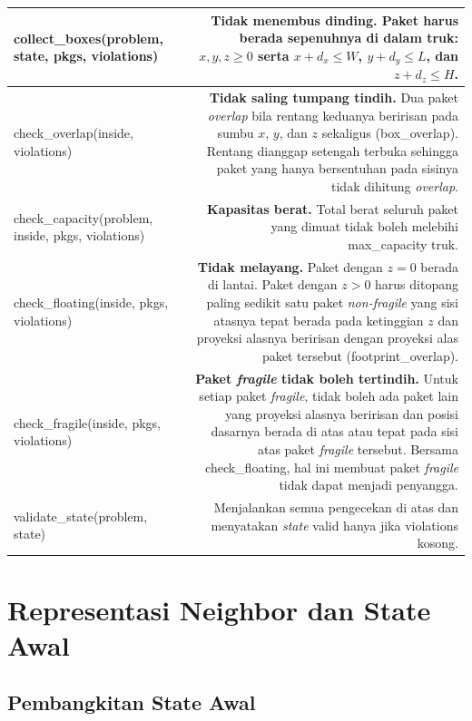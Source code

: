 \begin{longtable}{|K|D|}
collect\_boxes(problem, state, pkgs, violations) & \textbf{Tidak menembus dinding.} Paket harus berada sepenuhnya di dalam truk: $x, y, z \geq 0$ serta $x + d_x \leq W$, $y + d_y \leq L$, dan $z + d_z \leq H$. \\ \hline
check\_overlap(inside, violations) & \textbf{Tidak saling tumpang tindih.} Dua paket \textit{overlap} bila rentang keduanya beririsan pada sumbu $x$, $y$, dan $z$ sekaligus (box\_overlap). Rentang dianggap setengah terbuka sehingga paket yang hanya bersentuhan pada sisinya tidak dihitung \textit{overlap}. \\ \hline
check\_capacity(problem, inside, pkgs, violations) & \textbf{Kapasitas berat.} Total berat seluruh paket yang dimuat tidak boleh melebihi max\_capacity truk. \\ \hline
check\_floating(inside, pkgs, violations) & \textbf{Tidak melayang.} Paket dengan $z = 0$ berada di lantai. Paket dengan $z > 0$ harus ditopang paling sedikit satu paket \textit{non-fragile} yang sisi atasnya tepat berada pada ketinggian $z$ dan proyeksi alasnya beririsan dengan proyeksi alas paket tersebut (footprint\_overlap). \\ \hline
check\_fragile(inside, pkgs, violations) & \textbf{Paket \textit{fragile} tidak boleh tertindih.} Untuk setiap paket \textit{fragile}, tidak boleh ada paket lain yang proyeksi alasnya beririsan dan posisi dasarnya berada di atas atau tepat pada sisi atas paket \textit{fragile} tersebut. Bersama check\_floating, hal ini membuat paket \textit{fragile} tidak dapat menjadi penyangga. \\ \hline
validate\_state(problem, state) & Menjalankan semua pengecekan di atas dan menyatakan \textit{state} valid hanya jika violations kosong. \\ \hline
\end{longtable}


\section{Representasi Neighbor dan State Awal}
\label{sec:neighbor-impl}

\subsection{Pembangkitan State Awal}

